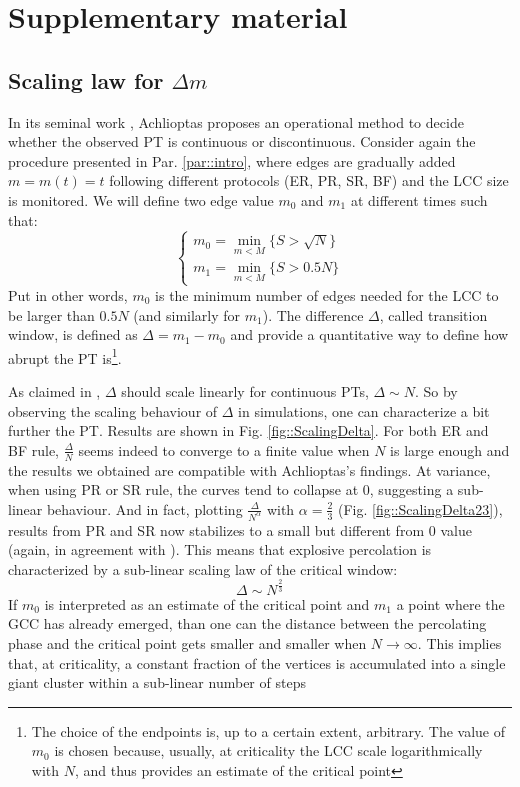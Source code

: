 \section{Supplementary material}
\subsection{Scaling law for $\Delta m$}
\label{par:scaling}
In its seminal work \cite{Achlioptas}, Achlioptas proposes an operational method to decide whether the observed PT is continuous or discontinuous. Consider again the procedure presented in Par. \ref{par::intro}, where edges are gradually added $m = m(t) = t$ following different protocols (ER, PR, SR, BF) and the LCC size is monitored. We will define two edge value $m_0$ and $m_1$ at different times such that:
\begin{equation}
	\begin{cases}
		m_0 = \min_{m < M}\{S > \sqrt{N}\} \\
		m_1 = \min_{m < M}\{ S > 0.5 N\} 
	\end{cases}
\end{equation}
Put in other words, $m_0$ is the minimum number of edges needed for the LCC to be larger than $0.5N$ (and similarly for $m_1$). The difference $\Delta$, called transition window, is defined as $\Delta = m_1 - m_0$ and provide a quantitative way to define how abrupt the PT is\footnote{The choice of the endpoints is, up to a certain extent, arbitrary. The value of $m_0$ is chosen because, usually, at criticality the LCC scale logarithmically with $N$, and thus provides an estimate of the critical point}.  

As claimed in \cite{Achlioptas}, $\Delta$ should scale linearly for continuous PTs, $\Delta \sim N$. So by observing the scaling behaviour of $\Delta$ in simulations, one can characterize a bit further the PT. Results are shown in Fig. \ref{fig::ScalingDelta}. For both ER and BF rule, $\frac{\Delta }{N}$ seems indeed to converge to a finite value when $N$ is large enough and the results we obtained are compatible with Achlioptas's findings. At variance, when using PR or SR rule, the curves tend to collapse at $0$, suggesting a sub-linear behaviour. And in fact, plotting $\frac{\Delta}{N^{\alpha}}$ with $\alpha = \frac{2}{3}$ (Fig. \ref{fig::ScalingDelta23}), results from PR and SR now stabilizes to a small but different from $0$ value (again, in agreement with \cite{Achlioptas}). This means that explosive percolation is characterized by a sub-linear scaling law of the critical window:
$$
\Delta \sim N^{\frac{2}{3}}
$$
If $m_0$ is interpreted as an estimate of the critical point and $m_1$ a point where the GCC has already emerged, than one can the distance between the percolating phase and the critical point gets smaller and smaller when $N \to \infty$. 
This implies that, at criticality, a constant fraction of the vertices is accumulated into a single giant cluster within a sub-linear number of steps \cite{PercolationReview}

